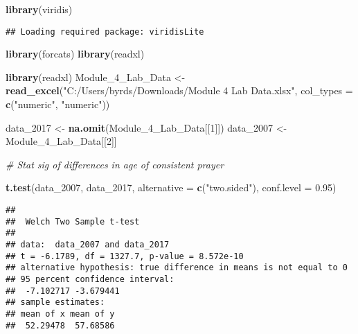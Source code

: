 \documentclass[
]{article}
\newenvironment{Shaded}{\begin{snugshade}}{\end{snugshade}}
\newcommand{\AttributeTok}[1]{\textcolor[rgb]{0.13,0.29,0.53}{#1}}
\newcommand{\CommentTok}[1]{\textcolor[rgb]{0.56,0.35,0.01}{\textit{#1}}}
\newcommand{\DecValTok}[1]{\textcolor[rgb]{0.00,0.00,0.81}{#1}}
\newcommand{\FloatTok}[1]{\textcolor[rgb]{0.00,0.00,0.81}{#1}}
\newcommand{\FunctionTok}[1]{\textcolor[rgb]{0.13,0.29,0.53}{\textbf{#1}}}
\newcommand{\NormalTok}[1]{#1}
\newcommand{\OtherTok}[1]{\textcolor[rgb]{0.56,0.35,0.01}{#1}}
\newcommand{\StringTok}[1]{\textcolor[rgb]{0.31,0.60,0.02}{#1}}
\begin{document}
\begin{Shaded}
\begin{Highlighting}[]
\FunctionTok{library}\NormalTok{(viridis)}
\end{Highlighting}
\end{Shaded}

\begin{verbatim}
## Loading required package: viridisLite
\end{verbatim}

\begin{Shaded}
\begin{Highlighting}[]
\FunctionTok{library}\NormalTok{(forcats)}
\FunctionTok{library}\NormalTok{(readxl)}

\FunctionTok{library}\NormalTok{(readxl)}
\NormalTok{Module\_4\_Lab\_Data }\OtherTok{\textless{}{-}} \FunctionTok{read\_excel}\NormalTok{(}\StringTok{"C:/Users/byrds/Downloads/Module 4 Lab Data.xlsx"}\NormalTok{, }
                                \AttributeTok{col\_types =} \FunctionTok{c}\NormalTok{(}\StringTok{"numeric"}\NormalTok{, }\StringTok{"numeric"}\NormalTok{))}

\NormalTok{data\_2017 }\OtherTok{\textless{}{-}} \FunctionTok{na.omit}\NormalTok{(Module\_4\_Lab\_Data[[}\DecValTok{1}\NormalTok{]])}
\NormalTok{data\_2007 }\OtherTok{\textless{}{-}}\NormalTok{ Module\_4\_Lab\_Data[[}\DecValTok{2}\NormalTok{]]}

\CommentTok{\# Stat sig of differences in age of consistent prayer}

\FunctionTok{t.test}\NormalTok{(data\_2007, data\_2017, }\AttributeTok{alternative =} \FunctionTok{c}\NormalTok{(}\StringTok{"two.sided"}\NormalTok{),}
       \AttributeTok{conf.level =} \FloatTok{0.95}\NormalTok{)}
\end{Highlighting}
\end{Shaded}

\begin{verbatim}
## 
##  Welch Two Sample t-test
## 
## data:  data_2007 and data_2017
## t = -6.1789, df = 1327.7, p-value = 8.572e-10
## alternative hypothesis: true difference in means is not equal to 0
## 95 percent confidence interval:
##  -7.102717 -3.679441
## sample estimates:
## mean of x mean of y 
##  52.29478  57.68586
\end{verbatim}
\end{document}
